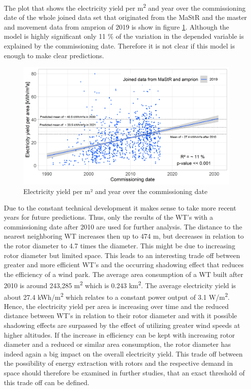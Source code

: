 \documentclass[a4paper,11pt]{article}
\begin{document}
The plot that shows the electricity yield per m\textsuperscript{2} and year over the commissioning date of the whole joined data set that originated from the MaStR and the master and movement data from amprion of 2019 is show in figure \ref{fig:eyarea}. Although the model is highly significant only 11 \% of the variation in the depended variable is explained by the commissioning date. Therefore it is not clear if this model is enough to make clear predictions.
\begin{figure}

{\centering \includegraphics[width=1\linewidth]{data/Area_consumption_of_wind_turbines/e_yield_per_m2_over_commissioning_date} 

}

\caption{Electricity yield per m² and year over the commissioning date}\label{fig:eyarea}
\end{figure}
Due to the constant technical development it makes sense to take more recent years for future predictions. Thus, only the results of the WT's with a commissioning date after 2010 are used for further analysis. The distance to the nearest neighboring WT increases then up to 474 m, but decreases in relation to the rotor diameter to 4.7 times the diameter. This might be due to increasing rotor diameter but limited space. This leads to an interesting trade off between greater and more efficient WT's and the occurring shadowing effect that reduces the efficiency of a wind park. The average area consumption of a WT built after 2010 is around 243,285 m\textsuperscript{2} which is 0.243 km\textsuperscript{2}. The average electricity yield is about 27.4 kWh/m\textsuperscript{2} which relates to a constant power output of 3.1 W/m\textsuperscript{2}. Hence, the electricity yield per area is increasing over time and the reduced distance between WT's in relation to their rotor diameter and with it possible shadowing effects are surpassed by the effect of utilizing greater wind speeds at higher altitudes. If the increase in efficiency can be kept with increasing rotor diameter and a reduced or similar area consumption, the rotor diameter has indeed again a big impact on the overall electricity yield. This trade off between the possibility of energy extraction with rotors and the respective demand in space should therefore be examined in further studies, that an exact threshold of this trade off can be defined.
\end{document}
